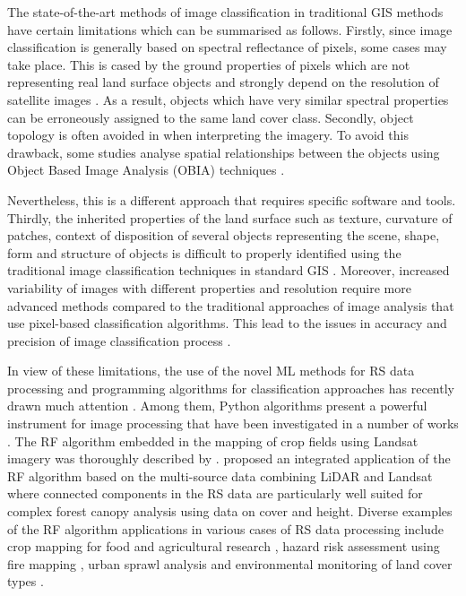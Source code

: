 \documentclass[eprint,
approc,		%
]{actapoly}
\begin{document}
The state-of-the-art methods of image classification in traditional GIS methods have certain limitations which can be summarised as follows. Firstly, since image classification is generally based on spectral reflectance of pixels, some cases may take place. This is cased by the ground properties of pixels which are not representing real land surface objects and strongly depend on the resolution of satellite images \citep{6351712,Lemenkova202322}. As a result, objects which have very similar spectral properties can be erroneously assigned to the same land cover class. Secondly, object topology is often avoided in when interpreting the imagery. To avoid this drawback, some studies analyse spatial relationships between the objects using Object Based Image Analysis (OBIA) techniques \citep{LUCIANO2019127,PHIRI2018170,DEWALI20233109,MAO202011}. 

Nevertheless, this is a different approach that requires specific software and tools. Thirdly, the inherited properties of the land surface such as texture, curvature of patches, context of disposition of several objects representing the scene, shape, form and structure of objects is difficult to properly identified using the traditional image classification techniques in standard GIS \citep{OUSMANOU2024100239,ZHANG2023129590,BAKR2010592}. Moreover, increased variability of images with different properties and resolution require more advanced methods compared to the traditional approaches of image analysis that use pixel-based classification algorithms. This lead to the issues in accuracy and precision of image classification process \citep{Fisher,McKee}.

In view of these limitations, the use of the novel ML methods for RS data processing and programming algorithms for classification approaches has recently drawn much attention \citep{Ayhan}. Among them, Python algorithms present a powerful instrument for image processing that have been investigated in a number of works \citep{9884244,9883588,Lemenkova202227,9006205,7724471}. The RF algorithm embedded in the mapping of crop fields using Landsat imagery was thoroughly described by \citep{LUCIANO2021106063}. \citep{AHMED201589} proposed an integrated application of the RF algorithm based on the multi-source data combining LiDAR and Landsat where connected components in the RS data are particularly well suited for complex forest canopy analysis using data on cover and height. Diverse examples of the RF algorithm applications in various cases of RS data processing include crop mapping for food and agricultural research \citep{OLIPHANT2019110,TELUGUNTLA2018325}, hazard risk assessment using fire mapping \citep{COLLINS2020111839}, urban sprawl analysis \citep{GHOSH201431} and environmental monitoring of land cover types \citep{MELVILLE201846,GRINAND201368}. 
\end{document}
